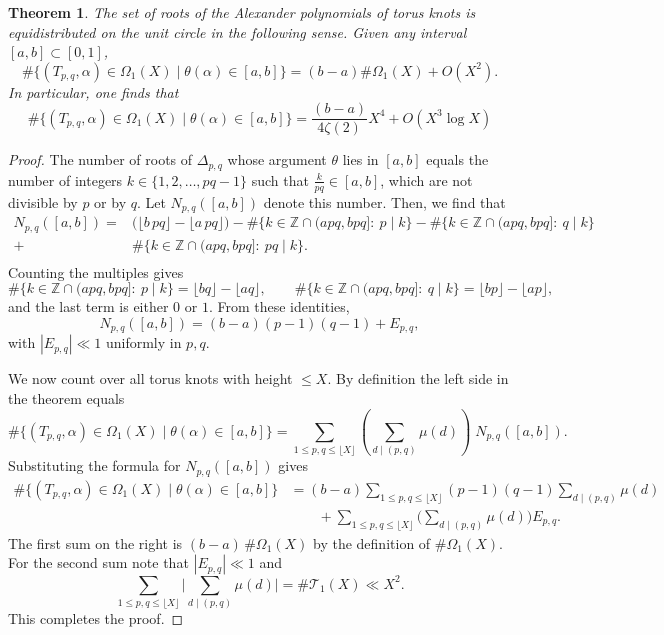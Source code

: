 \documentclass[table]{amsart}
\newtheorem{theorem}{Theorem}[section]
\numberwithin{equation}{section}
\begin{document}
\begin{theorem}\label{section 3 main thm 1}
    The set of roots of the Alexander polynomials of torus knots is equidistributed on the unit circle in the following sense. Given any interval $[a,b]\subset [0, 1]$, 
    \begin{equation}\#\{(T_{p,q}, \alpha)\in \Omega_1(X)\mid \theta(\alpha)\in [a,b]\}=(b-a) \# \Omega_1(X)+O(X^2).\end{equation}
    In particular, one finds that 
    \[\#\{(T_{p,q}, \alpha)\in \Omega_1(X)\mid \theta(\alpha)\in [a,b]\}=\frac{(b-a)}{4 \zeta(2)} X^4 + O(X^3\log X)\]
\end{theorem}
\begin{proof}
The number of roots of \(\Delta_{p,q}\) whose argument \(\theta\) lies in \([a,b]\) equals the number of integers $k\in\{1,2,\dots,pq-1\}$ such that $\frac{k}{pq}\in[a,b]$, which are not divisible by \(p\) or by \(q\). Let \(N_{p,q}([a,b])\) denote this number. Then, we find that
\[
\begin{split}N_{p,q}([a,b])
= &\big(\lfloor b\,pq\rfloor-\lfloor a\,pq\rfloor\big)
- \#\{k\in\mathbb Z\cap(a pq,b pq]:\ p\mid k\}
- \#\{k\in\mathbb Z\cap(a pq,b pq]:\ q\mid k\}\\
+ &\#\{k\in\mathbb Z\cap(a pq,b pq]:\ pq\mid k\}.\\
\end{split}
\]
Counting the multiples gives
\[
\#\{k\in\mathbb Z\cap(a pq,b pq]:\ p\mid k\}=\lfloor bq\rfloor-\lfloor a q\rfloor,
\qquad
\#\{k\in\mathbb Z\cap(a pq,b pq]:\ q\mid k\}=\lfloor b p\rfloor-\lfloor a p\rfloor,
\]
and the last term is either \(0\) or \(1\). From these identities,
\[
N_{p,q}([a,b]) = (b-a)(p-1)(q-1) + E_{p,q},
\]
with \(|E_{p,q}|\ll 1\) uniformly in \(p,q\).
\par We now count over all torus knots with height \(\le X\). By definition the left side in the theorem equals
\[
\#\{(T_{p,q},\alpha)\in\Omega_1(X)\mid \theta(\alpha)\in[a,b]\}
= \sum_{1\le p,q\le\lfloor X\rfloor}( \sum_{d\mid(p,q)}\mu(d) )\; N_{p,q}([a,b]).
\]
Substituting the formula for \(N_{p,q}([a,b])\) gives
\[
\begin{aligned}
\#\{(T_{p,q},\alpha)\in\Omega_1(X)\mid \theta(\alpha)\in[a,b]\}
&= (b-a)\sum_{1\le p,q\le\lfloor X\rfloor}(p-1)(q-1)\sum_{d\mid(p,q)}\mu(d) \\
&\qquad + \sum_{1\le p,q\le\lfloor X\rfloor}\Big(\sum_{d\mid(p,q)}\mu(d)\Big)E_{p,q}.
\end{aligned}
\]
The first sum on the right is \((b-a)\,\#\Omega_1(X)\) by the definition of \(\#\Omega_1(X)\). For the second sum note that \(|E_{p,q}|\ll1\) and
\[
\sum_{1\le p,q\le\lfloor X\rfloor}\Big|\sum_{d\mid(p,q)}\mu(d)\Big|
= \#\mathcal{T}_1(X)\ll X^2.
\] This completes the proof.
\end{proof}
\end{document}

